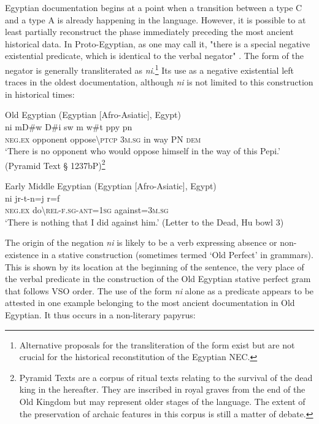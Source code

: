 \documentclass[output=paper]{langsci/langscibook}
\begin{document}
Egyptian documentation begins at a point when a transition between a type C and a type A is already happening in the language. However, it is possible to at least partially reconstruct the phase immediately preceding the most ancient historical data. In Proto-Egyptian, as one may call it, "there is a special negative existential predicate, which is identical to the verbal negator" \citet[6]{Croft1991}. 
The form of the negator is generally transliterated as \textit{ni}.\footnote{Alternative proposals for the transliteration of the form exist but are not crucial for the historical reconstitution of the Egyptian NEC.} 
Its use as a negative existential left traces in the oldest documentation, although \textit{ni} is not limited to this construction in historical times:

\ea Old Egyptian (Egyptian [Afro-Asiatic], Egypt) \label{ex:AE1}\\
  	\gll ni mD\#w D\#i sw m w\#t ppy pn\\ 
	\textsc{neg.ex}	opponent oppose\textbackslash\textsc{ptcp} \textsc{3m.sg} in way 	PN \textsc{dem}\\
	\glt ‘There is no opponent who would oppose himself in the way of this Pepi.’ (Pyramid Text § 1237bP)\footnote{Pyramid Texts are a corpus of ritual texts relating to the survival of the dead king in the hereafter. They are inscribed in royal graves from the end of the Old Kingdom but may represent older stages of the language. The extent of the preservation of archaic features in this corpus is still a matter of debate.}
\z

\ea Early Middle Egyptian (Egyptian [Afro-Asiatic], Egypt) \label{ex:AE2}\\
	\gll ni jr-t-n=j r=f\\
	\textsc{neg.ex} do\textbackslash\textsc{rel-f.sg-ant=1sg} against=\textsc{3m.sg}\\
	\glt ‘There is nothing that I did against him.’ (Letter to the Dead, Hu bowl 3)
\z

The origin of the negation \textit{ni} is likely to be a verb expressing absence or non-existence in a stative construction (sometimes termed ‘Old Perfect’ in grammars). This is shown by its location at the beginning of the sentence, the very place of the verbal predicate in the construction of the Old Egyptian stative perfect gram that follows VSO order. The use of the form \textit{ni} alone as a predicate appears to be attested in one example belonging to the most ancient documentation in Old Egyptian. It thus occurs in a non-literary papyrus: 
\end{document}
